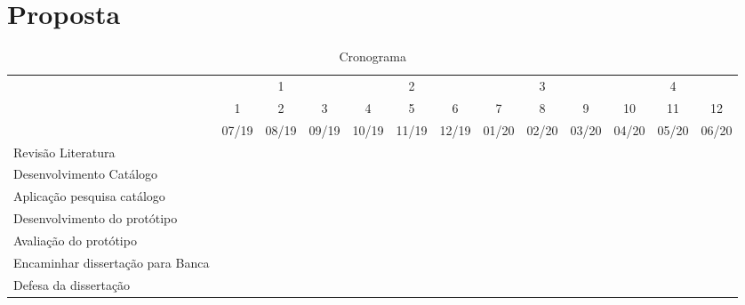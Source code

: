 \chapter{Proposta}
\label{chap:proposta}

\begin{table}[!htpb]
    \centering
    \caption{Cronograma}
    \label{tab:cronograma}
    \begin{scriptsize}
    \begin{tabular}{|p{2cm}|c|c|c|c|c|c|c|c|c|c|c|c|}\hline
         &\multicolumn{3}{c|}{1} &
        \multicolumn{3}{c|}{2} &
        \multicolumn{3}{c|}{3} &
        \multicolumn{3}{c|}{4}\\\cline{2-13}
         & 1 & 2 & 3 & 4 & 5 & 6 & 7 & 8 & 9 & 10 & 11 & 12\\\cline{2-13} 
         & 07/19 & 08/19 & 09/19 & 10/19 & 11/19 & 12/19 & 01/20 & 02/20 & 03/20 & 04/20 & 05/20 & 06/20 
         \\\hline    
         
         Revisão Literatura & \cellcolor{gray!50} & \cellcolor{gray!50} & \cellcolor{gray!50} &\cellcolor{gray!50} & \cellcolor{gray!50}& & & & & & & \\[10pt]\hline
         
         Desenvolvimento Catálogo & &\cellcolor{gray!50} &\cellcolor{gray!50} &\cellcolor{gray!50} & \cellcolor{gray!50}& \cellcolor{gray!50}& & & & & & \\[10pt]\hline    
         
         Aplicação pesquisa catálogo & & & & & & &\cellcolor{gray!50} &\cellcolor{gray!50} & & & & \\[10pt]\hline    
         
         Desenvolvimento do protótipo & & & & &\cellcolor{gray!50} &\cellcolor{gray!50} &\cellcolor{gray!50} &\cellcolor{gray!50} &\cellcolor{gray!50} & & & \\[10pt]\hline    
         
         Avaliação do protótipo & & & & & & & & &\cellcolor{gray!50} &\cellcolor{gray!50} & & \\[10pt]\hline    
         
         Encaminhar dissertação para Banca & & & & & & & & & & &\cellcolor{gray!50} & \\[10pt]\hline  
         
         Defesa da dissertação & & & & & & & & & & & &\cellcolor{gray!50} \\[10pt]\hline    
    \end{tabular}
    \end{scriptsize}
\end{table}